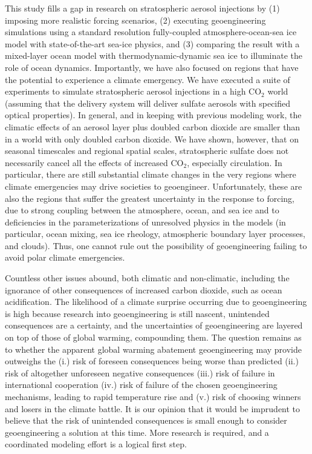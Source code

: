 \documentclass[12pt]{article}
\begin{document}
This study fills a gap in research on stratospheric aerosol injections by (1) imposing more realistic forcing scenarios, (2) executing geoengineering simulations using a standard resolution fully-coupled atmosphere-ocean-sea ice model with state-of-the-art sea-ice physics, and (3) comparing the result with a mixed-layer ocean model with thermodynamic-dynamic sea ice to illuminate the role of ocean dynamics. Importantly, we have also focused on regions that have the potential to experience a climate emergency. We have executed a suite of experiments to simulate stratospheric aerosol injections in a high CO$_2$ world (assuming that the delivery system will deliver sulfate aerosols with specified optical properties). In general, and in keeping with previous modeling work, the climatic effects of an aerosol layer plus doubled carbon dioxide are smaller than in a world with only doubled carbon dioxide. We have shown, however, that on seasonal timescales and regional spatial scales, stratospheric sulfate does not necessarily cancel all the effects of increased CO$_2$, especially circulation. In particular, there are still substantial climate changes in the very regions where climate emergencies may drive societies to geoengineer. Unfortunately, these are also the regions that suffer the greatest uncertainty in the response to forcing, due to strong coupling between the atmosphere, ocean, and sea ice and to deficiencies in the parameterizations of unresolved physics in the models (in particular, ocean mixing, sea ice rheology, atmospheric boundary layer processes, and clouds). Thus, one cannot rule out the possibility of geoengineering failing to avoid polar climate emergencies.

Countless other issues abound, both climatic and non-climatic, including the ignorance of other consequences of increased carbon dioxide, such as ocean acidification. The likelihood of a climate surprise occurring due to geoengineering is high because research into geoengineering is still nascent, unintended consequences are a certainty, and the uncertainties of geoengineering are layered on top of those of global warming, compounding them. The question remains as to whether the apparent global warming abatement geoengineering may provide outweighs the (i.) risk of foreseen consequences being worse than predicted (ii.) risk of altogether unforeseen negative consequences (iii.) risk of failure in international cooperation (iv.) risk of failure of the chosen geoengineering mechanisms, leading to rapid temperature rise and (v.) risk of choosing winners and losers in the climate battle. It is our opinion that it would be imprudent to believe that the risk of unintended consequences is small enough to consider geoengineering a solution at this time. More research is required, and a coordinated modeling effort is a logical first step.
\end{document}
